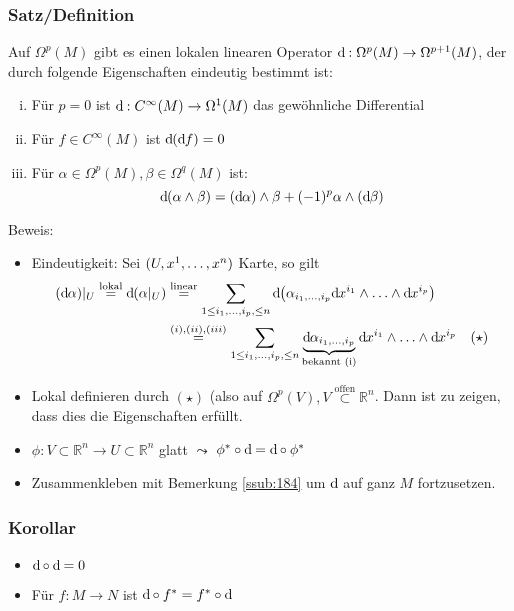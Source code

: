 \subsubsection{Satz/Definition}
\label{ssub:191}
Auf $\Omega^p(M)$ gibt es einen lokalen linearen Operator $\mathrm{d}\mkern-1.0mu : \Omega^p (M) \to \Omega^{p+1} (M)$, der durch folgende Eigenschaften eindeutig bestimmt ist:
\begin{enumerate}[(i)]
\item Für $p = 0$ ist $\mathrm{d}\mkern-1.0mu: C^\infty (M) \to \Omega^1 (M)$ das gewöhnliche Differential
\item Für $f\in C^\infty (M)$ ist $\mathrm{d}\mkern-1.0mu(\mathrm{d}\mkern-1.0mu f) = 0$
\item Für $\alpha\in \Omega^p(M), \beta \in \Omega^q(M)$ ist:
\[
\mathrm{d}\mkern-1.0mu(\alpha \wedge \beta) = (\mathrm{d}\mkern-1.0mu \alpha) \wedge \beta + (-1)^p \alpha \wedge (\mathrm{d}\mkern-1.0mu \beta)
\]
\end{enumerate}
Beweis:
\begin{itemize}
\item Eindeutigkeit: Sei $(U,x^1,\ldots,x^n)$ Karte, so gilt
\begin{align*}
(\mathd \alpha)\vert_U \overset{\text{lokal}}{=} \mathd(\alpha\vert_U) &\overset{\text{linear}}{=} \sum_{1\leq i_1,\ldots,i_p,\leq n} \mathd \enbrace*{\alpha_{i_1,\ldots, i_p}  \mathd x^{i_1} \wedge \ldots \wedge \mathd x^{i_p}}\\
&\overset{(i),(ii),(iii)}{=} \sum_{1\leq i_1,\ldots,i_p,\leq n} \underbrace{\mathd\alpha_{i_1,\ldots, i_p}}_{\text{bekannt (i)}}\mathd x^{i_1} \wedge \ldots \wedge \mathd x^{i_p}\quad (\star)
\end{align*}
\item Lokal definieren durch $(\star)$ (also auf $\Omega^p (V), V\overset{\text{offen}}{\subset} \mathds{R}^n$. Dann ist zu zeigen, dass dies die Eigenschaften erfüllt.
\item $\phi: V\subset \mathds{R}^n \to U \subset \mathds{R}^n$ glatt $\leadsto$ $\phi^* \circ \mathrm{d}\mkern-1.0mu = \mathrm{d}\mkern-1.0mu \circ \phi^*$
\item Zusammenkleben mit Bemerkung \ref{ssub:184} um $\mathrm{d}\mkern-1.0mu$ auf ganz $M$ fortzusetzen.
\end{itemize}

\subsubsection{Korollar}
\label{ssub:192}
\begin{itemize}
\item $\mathrm{d}\mkern-1.0mu \circ \mathrm{d}\mkern-1.0mu = 0$
\item Für $f:M\to N$ ist $\mathrm{d}\mkern-1.0mu \circ f^* = f^* \circ \mathrm{d}\mkern-1.0mu$
\end{itemize}

